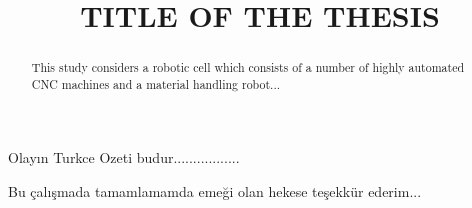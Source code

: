 \documentclass{etutez}
\title{TITLE OF THE THESIS}
\institute{Institute of Natural and Applied Sciences}
\begin{document}
\titlepageMS   %
\signaturepageMS  %
\tezbildirimsayfasi    %


\begin{ozet}
 Olay{\i}n Turkce Ozeti budur.................
\end{ozet}



\begin{abstract}
This study considers a robotic cell which consists of a number of highly automated CNC machines and a material handling robot...
\end{abstract}


\begin{tesekkur}
 Bu \c{c}al{\i}\c{s}mada tamamlamamda eme\u{g}i olan hekese te\c{s}ekk\"ur ederim...
\end{tesekkur}



\pagestyle{plain}




\makeatother
\end{document}
